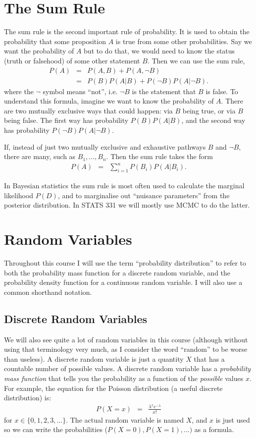 \section{The Sum Rule}
The sum rule is the second important rule of probability. It is used to obtain
the probability that some proposition $A$ is true from some other
probabilities. Say we want the probability of $A$ but to do that, we would need
to know the status (truth or falsehood) of some other statement $B$. Then we
can use the sum rule,
\begin{eqnarray}
P(A) &=& P(A, B) + P(A, \neg B)\\
&=& P(B)P(A|B) + P(\neg B)P(A|\neg B).
\end{eqnarray}
where the $\neg$ symbol means ``not'', i.e. $\neg B$ is the statement that
$B$ is false. To understand
this formula, imagine we want to know the probability of $A$. There are
two mutually exclusive ways that could happen: via $B$ being true, or via $B$
being false. The first way has probability $P(B)P(A|B)$, and the second way
has probability $P(\neg B)P(A|\neg B)$.

If, instead of just two mutually exclusive and exhaustive
pathways $B$ and $\neg B$, there are many, such as $B_1, ..., B_n$.
Then the sum rule takes the form
\begin{eqnarray}
P(A) &=& \sum_{i=1}^n P(B_i)P(A|B_i).
\end{eqnarray}

In Bayesian statistics the sum rule is most often used to calculate the
marginal likelihood $P(D)$, and to marginalise out ``nuisance
parameters'' from the posterior distribution. In STATS 331 we will mostly use
MCMC to do the latter.

\section{Random Variables}
Throughout this course I will use the term ``probability distribution'' to
refer to both the probability mass function for a discrete random variable, and
the probability density function for a continuous random variable. I will also
use a common shorthand notation.

\subsection{Discrete Random Variables}
We will also see quite a lot of random variables in this course (although
without using that terminology very much, as I consider the word ``random'' to be
worse than useless). A discrete
random variable is just a quantity $X$ that has a countable number of possible
values. A discrete random variable has a {\it probability mass function}
that tells you the probability as a function of the {\it possible} values $x$.
For example, the equation for the Poisson distribution (a useful discrete
distribution) is:
\begin{eqnarray}
P(X=x) &=& \frac{\lambda^x e^{-\lambda}}{x!}\label{eq:poisson}
\end{eqnarray}
for $x \in \{0, 1, 2, 3, ...\}$. The actual random variable is named $X$, and
$x$ is just used so we can write the probabilities ($P(X=0), P(X=1), ...)$ as
a formula.

